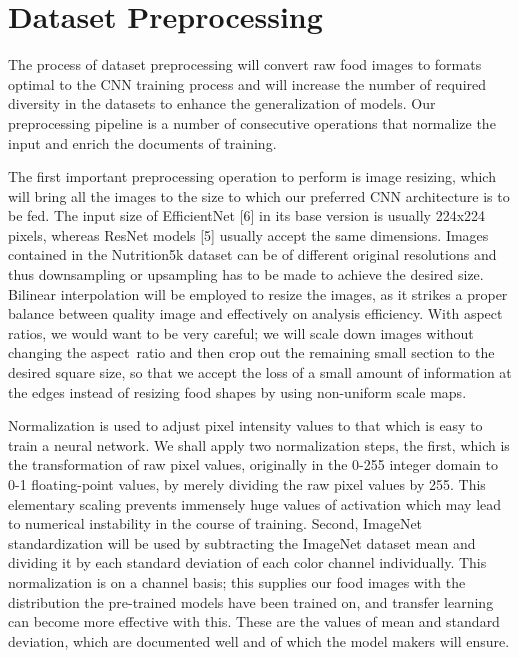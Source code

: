 \documentclass[12pt, openany]{report}
\begin{document}
\section{Dataset Preprocessing}
The process of dataset preprocessing will convert raw food images to formats optimal to the CNN training process and will increase the number of required diversity in the datasets to enhance the generalization of models. Our preprocessing pipeline is a number of consecutive operations that normalize the input and enrich the documents of training.

The first important preprocessing operation to perform is image resizing, which will bring all the images to the size to which our preferred CNN architecture is to be fed. The input size of EfficientNet [6] in its base version is usually 224x224 pixels, whereas ResNet models [5] usually accept the same dimensions. Images contained in the Nutrition5k dataset can be of different original resolutions and thus downsampling or upsampling has to be made to achieve the desired size. Bilinear interpolation will be employed to resize the images, as it strikes a proper balance between quality image and effectively on analysis efficiency. With aspect ratios, we would want to be very careful; we will scale down images without changing the aspect~ratio and then crop out the remaining small section to the desired square size, so that we accept the loss of a small amount of information at the edges instead of resizing food shapes by using non-uniform scale maps.

Normalization is used to adjust pixel intensity values to that which is easy to train a neural network. We shall apply two normalization steps, the first, which is the transformation of raw pixel values, originally in the 0-255 integer domain to 0-1 floating-point values, by merely dividing the raw pixel values by 255. This elementary scaling prevents immensely huge values of activation which may lead to numerical instability in the course of training. Second, ImageNet standardization will be used by subtracting the ImageNet dataset mean and dividing it by each standard deviation of each color channel individually. This normalization is on a channel basis; this supplies our food images with the distribution the pre-trained models have been trained on, and transfer learning can become more effective with this. These are the values of mean and standard deviation, which are documented well and of which the model makers will ensure.
\end{document}
